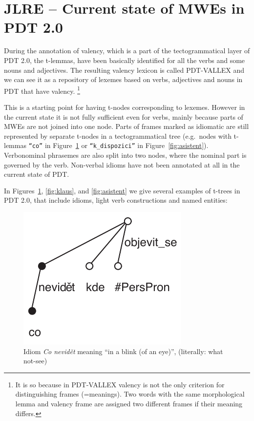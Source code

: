 \section{JLRE -- Current state of MWEs in PDT 2.0}
\label{sec:pdt}
%

During the annotation of valency, which is a part of the tectogrammatical layer of PDT 2.0, the t-lemmas, have been basically identified for all the verbs and some nouns and adjectives.
The resulting valency lexicon is called PDT-VALLEX \citep{hajic:2003} and we can see it as a repository of lexemes based on verbs, adjectives and nouns in PDT that have valency.
%
\footnote{It is so because in PDT-VALLEX valency is not the only criterion for distinguishing frames (=meanings). Two words with the same morphological lemma and valency frame are assigned two different frames if their meaning differs.} 

This is a starting point for having t-nodes corresponding to lexemes. However in the current state it is not fully sufficient even for verbs, mainly because parts of MWEs are not joined into one node. Parts of frames marked as idiomatic are still represented by separate t-nodes in a tectogrammatical tree (e.g.~nodes with t-lemmas {\tt“co”} in Figure~\ref{fig:co-nevidet} or {\tt“k\_dispozici”} in Figure~\ref{fig:asistent}). Verbonominal phrasemes are also split into two nodes, where the nominal part is governed by the verb. Non-verbal idioms have not been annotated at all in the current state of PDT. 

In Figures~\ref{fig:co-nevidet}, \ref{fig:klaus}, and \ref{fig:asistent} we give several examples of t-trees in PDT 2.0, that include idioms, light verb constructions and named entities:
\begin{figure}[htbp]
   \centerline{\includegraphics[scale=.7]{images/co-nevidet-clause.pdf}}
   \caption{Idiom \emph{Co nevidět} meaning ``in a blink (of an eye)'', (literally: what not-see)}
   \label{fig:co-nevidet}
\end{figure}

